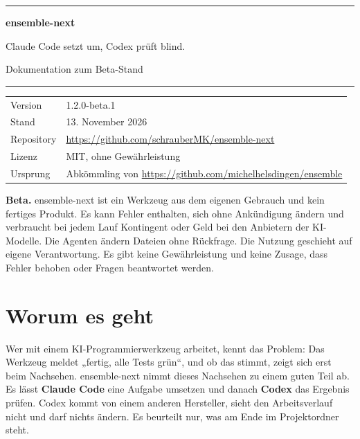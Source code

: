 \documentclass[a4paper,10pt,parskip=half-,headings=small]{scrartcl}
\begin{document}

\begin{titlepage}
\vspace*{28mm}
{\color{accent}\rule{\textwidth}{1.2pt}}\par\vspace{9mm}
{\fontsize{30}{34}\selectfont\bfseries\color{accent} ensemble-next\par}
\vspace{5mm}
{\Large Claude Code setzt um, Codex prüft blind.\par}
\vspace{2mm}
{\large\color{muted} Dokumentation zum Beta-Stand\par}
\vspace{9mm}
{\color{accent}\rule{\textwidth}{1.2pt}}\par
\vspace{14mm}

\begin{tabular}{@{}L{32mm}L{110mm}@{}}
Version & 1.2.0-beta.1 \\
Stand & 13. November 2026 \\
Repository & \url{https://github.com/schrauberMK/ensemble-next} \\
Lizenz & MIT, ohne Gewährleistung \\
Ursprung & Abkömmling von \url{https://github.com/michelhelsdingen/ensemble} \\
\end{tabular}

\vfill
\begin{hinweis}
\textbf{Beta.} ensemble-next ist ein Werkzeug aus dem eigenen Gebrauch und kein fertiges Produkt.
Es kann Fehler enthalten, sich ohne Ankündigung ändern und verbraucht bei jedem Lauf Kontingent
oder Geld bei den Anbietern der KI-Modelle. Die Agenten ändern Dateien ohne Rückfrage. Die Nutzung
geschieht auf eigene Verantwortung. Es gibt keine Gewährleistung und keine Zusage, dass Fehler
behoben oder Fragen beantwortet werden.
\end{hinweis}
\end{titlepage}

\tableofcontents
\clearpage

\section{Worum es geht}

Wer mit einem KI-Programmierwerkzeug arbeitet, kennt das Problem: Das Werkzeug meldet „fertig, alle
Tests grün“, und ob das stimmt, zeigt sich erst beim Nachsehen. ensemble-next nimmt dieses Nachsehen
zu einem guten Teil ab. Es lässt \textbf{Claude Code} eine Aufgabe umsetzen und danach \textbf{Codex}
das Ergebnis prüfen. Codex kommt von einem anderen Hersteller, sieht den Arbeitsverlauf nicht und
darf nichts ändern. Es beurteilt nur, was am Ende im Projektordner steht.
\end{document}
